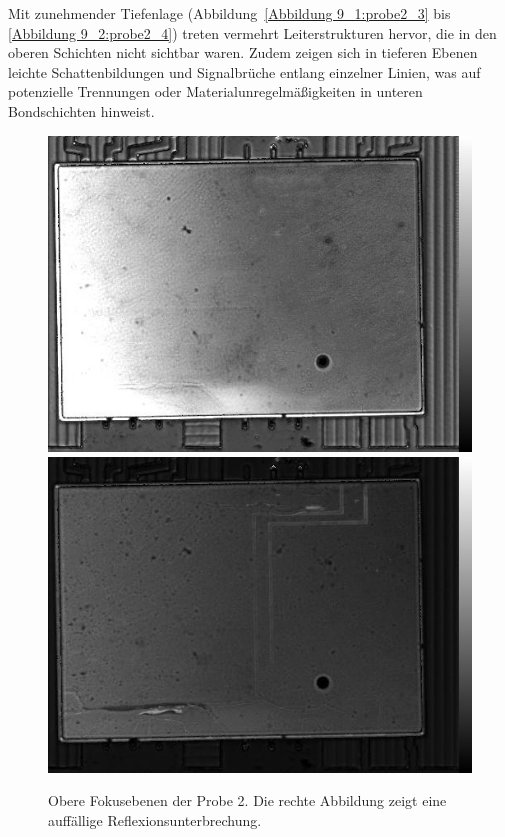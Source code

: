 Mit zunehmender Tiefenlage (Abbildung~\ref{Abbildung 9_1:probe2_3} bis \ref{Abbildung 9_2:probe2_4}) treten vermehrt Leiterstrukturen hervor, die in den oberen Schichten nicht sichtbar waren. Zudem zeigen sich in tieferen Ebenen leichte Schattenbildungen und Signalbrüche entlang einzelner Linien, was auf potenzielle Trennungen oder Materialunregelmäßigkeiten in unteren Bondschichten hinweist.
\vspace{0.2cm}
\begin{figure}[htbp]
    \centering
    \includegraphics[scale=0.30]{Bilder/Probe2_i794_x001.jpg}
    \includegraphics[scale=0.30]{Bilder/Probe2_i794_x002.jpg}
    \caption{Obere Fokusebenen der Probe 2. Die rechte Abbildung zeigt eine auffällige Reflexionsunterbrechung.}
    \label{Abbildung 8_1:probe2_1}
    \label{Abbildung 8_2:probe2_2}
\end{figure}

